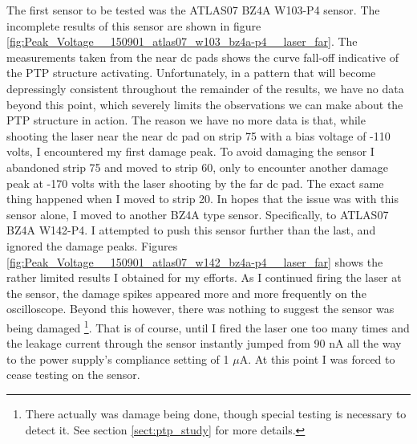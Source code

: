 \documentclass{report}
\begin{document}
            The first sensor to be tested was the ATLAS07 BZ4A W103-P4 sensor. The incomplete results of this sensor are shown in figure \ref{fig:Peak_Voltage__150901_atlas07_w103_bz4a-p4__laser_far}. The measurements taken from the near dc pads shows the curve fall-off indicative of the PTP structure activating. Unfortunately, in a pattern that will become depressingly consistent throughout the remainder of the results, we have no data beyond this point, which severely limits the observations we can make about the PTP structure in action. The reason we have no more data is that, while shooting the laser near the near dc pad on strip 75 with a bias voltage of -110 volts, I encountered my first damage peak. To avoid damaging the sensor I abandoned strip 75 and moved to strip 60, only to encounter another damage peak at -170 volts with the laser shooting by the far dc pad. The exact same thing happened when I moved to strip 20. In hopes that the issue was with this sensor alone, I moved to another BZ4A type sensor. Specifically, to ATLAS07 BZ4A W142-P4. I attempted to push this sensor further than the last, and ignored the damage peaks. Figures \ref{fig:Peak_Voltage__150901_atlas07_w142_bz4a-p4__laser_far} shows the rather limited results I obtained for my efforts. As I continued firing the laser at the sensor, the damage spikes appeared more and more frequently on the oscilloscope. Beyond this however, there was nothing to suggest the sensor was being damaged \footnote{There actually was damage being done, though special testing is necessary to detect it. See section \ref{sect:ptp_study} for more details.}. That is of course, until I fired the laser one too many times and the leakage current through the sensor instantly jumped from 90 nA all the way to the power supply's compliance setting of 1 $\mu$A. At this point I was forced to cease testing on the sensor.
\end{document}
